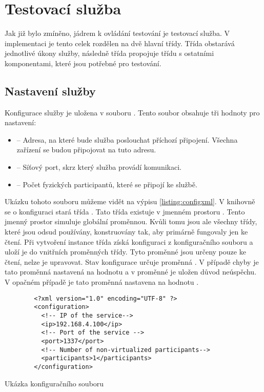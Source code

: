 \section{Testovací služba}
Jak již bylo zmíněno, jádrem k ovládání testování je testovací služba. V implementaci je tento celek rozdělen na dvě hlavní třídy. Třída  obstarává jednotlivé úkony služby, následně třída  propojuje třídu  s ostatními komponentami, které jsou potřebné pro testování.

\subsection{Nastavení služby}

Konfigurace služby je uložena v souboru . Tento soubor obsahuje tři hodnoty pro nastavení:

\begin{itemize}
    \item {} -- Adresa, na které bude služba poslouchat příchozí připojení. Všechna zařízení se budou připojovat na tuto adresu.
    \item {} -- Síťový port, skrz který služba provádí komunikaci.
    \item {} -- Počet fyzických participantů, které se připojí ke službě.   
\end{itemize}

Ukázku tohoto souboru můžeme vidět na výpisu \ref{listing:configxml}. V knihovně se o konfiguraci stará třída . Tato třída existuje v jmenném prostoru . Tento jmenný prostor simuluje globální proměnnou. Kvůli tomu jsou ale všechny třídy, které jsou odsud používány, konstruovány tak, aby primárně fungovaly jen ke čtení. Při vytvoření instance třída získá konfiguraci z konfiguračního souboru a uloží je do vnitřních proměnných třídy. Tyto proměnné jsou určeny pouze ke čtení, nelze je upravovat. Stav konfigurace určuje proměnná . V případě chyby je tato proměnná nastavená na hodnotu  a v proměnné  je uložen důvod neúspěchu. V opačném případě je tato proměnná nastavena na hodnotu .

\begin{listing}[htbp]
    \centering
    \begin{verbatim}
        <?xml version="1.0" encoding="UTF-8" ?>
        <configuration>
          <!-- IP of the service-->
          <ip>192.168.4.100</ip>
          <!-- Port of the service -->
          <port>1337</port>
          <!-- Number of non-virtualized participants-->
          <participants>1</participants>
        </configuration>
    \end{verbatim}
    \caption{Ukázka konfiguračního souboru}
    \label{listing:configxml}
\end{listing}


